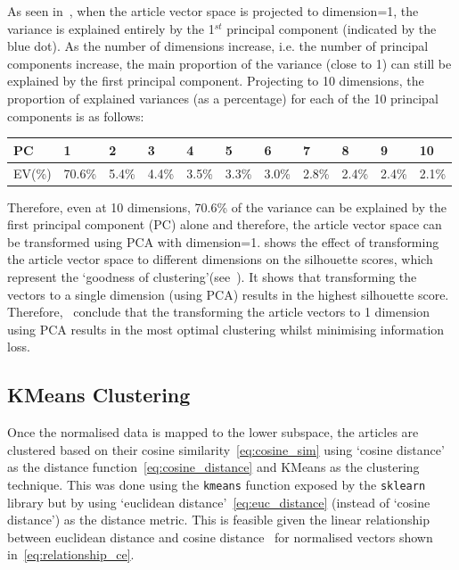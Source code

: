   As seen in~, when the article vector space is projected to dimension=1, the variance is explained entirely by the 1$^{st}$ principal component (indicated by the blue dot). As the number of dimensions increase, i.e. the number of principal components increase, the main proportion of the variance (close to 1) can still be explained by the first principal component. Projecting to 10 dimensions, the proportion of explained variances (as a percentage) for each of the 10 principal components is as follows: 
  \begin{table}[H]
      \centering
  \renewcommand{\arraystretch}{1.1}
  \begin{tabularx}{\textwidth}{|X|X X X X X X X X X X|} 
    \hline
    PC & \textbf{1} & \textbf{2}  & \textbf{3}  & \textbf{4}  & \textbf{5} & \textbf{6} & \textbf{7}  & \textbf{8}  & \textbf{9}  & \textbf{10}\\
    \hline
    EV(\%) & 70.6\% & 5.4\% & 4.4\% & 3.5\% & 3.3\% & 3.0\% & 2.8\% & 2.4\% & 2.4\% & 2.1\% \\ 
    \hline
    \end{tabularx}
  \end{table}

  Therefore, even at 10 dimensions, 70.6\% of the variance can be explained by the first principal component (PC) alone and therefore, the article vector space can be transformed using PCA with dimension=1.  shows the effect of transforming the article vector space to different dimensions on the silhouette scores, which represent the `goodness of clustering'(see~). It shows that transforming the vectors to a single dimension (using PCA) results in the highest silhouette score. Therefore,~ conclude that the transforming the article vectors to 1 dimension using PCA results in the most optimal clustering whilst minimising information loss.

\subsection{KMeans Clustering}
Once the normalised data is mapped to the lower subspace, the articles are clustered based on their cosine similarity~\cref{eq:cosine_sim} using `cosine distance' as the distance function~\cref{eq:cosine_distance} and KMeans as the clustering technique. This was done using the \texttt{kmeans} function exposed by the \texttt{sklearn} library but by using `euclidean distance'~\cref{eq:euc_distance} (instead of `cosine distance') as the distance metric. This is feasible given the linear relationship between euclidean distance and cosine distance~\cite{kmeans} for normalised vectors shown in~\cref{eq:relationship_ce}.

